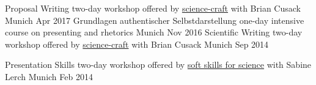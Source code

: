 


\begin{cvhonors}
  \cvhonor
    {Proposal Writing} %
    {two-day workshop offered by \href{http://www.science-craft.com/}{science-craft} with Brian Cusack} %
    {Munich} %
    {Apr 2017} %
  \cvhonor
    {Grundlagen authentischer Selbstdarstellung} %
    {one-day intensive course on presenting and rhetorics} %
    {Munich} %
    {Nov 2016} %
  \cvhonor
    {Scientific Writing} %
    {two-day workshop offered by \href{http://www.science-craft.com/}{science-craft} with Brian Cusack} %
    {Munich} %
    {Sep 2014} %
    
  \cvhonor
    {Presentation Skills} %
    {two-day workshop offered by \href{http://www.science.sabinelerch.de/} {soft skills for science} with Sabine Lerch} %
    {Munich} %
    {Feb 2014} %

\end{cvhonors}





